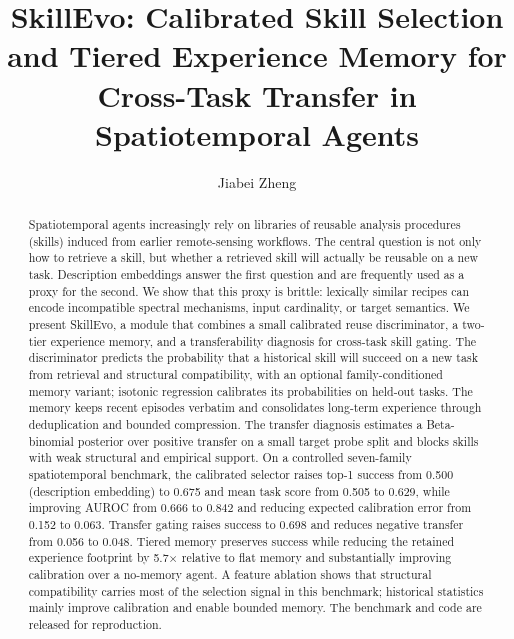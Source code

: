 \documentclass[journal]{IEEEtran}
\begin{document}
\title{SkillEvo: Calibrated Skill Selection and Tiered Experience Memory for Cross-Task Transfer in Spatiotemporal Agents}

\author{Jiabei Zheng}

\maketitle

\begin{abstract}
Spatiotemporal agents increasingly rely on libraries of reusable analysis procedures (skills) induced from earlier remote-sensing workflows. The central question is not only how to retrieve a skill, but whether a retrieved skill will actually be reusable on a new task. Description embeddings answer the first question and are frequently used as a proxy for the second. We show that this proxy is brittle: lexically similar recipes can encode incompatible spectral mechanisms, input cardinality, or target semantics. We present SkillEvo, a module that combines a small calibrated reuse discriminator, a two-tier experience memory, and a transferability diagnosis for cross-task skill gating. The discriminator predicts the probability that a historical skill will succeed on a new task from retrieval and structural compatibility, with an optional family-conditioned memory variant; isotonic regression calibrates its probabilities on held-out tasks. The memory keeps recent episodes verbatim and consolidates long-term experience through deduplication and bounded compression. The transfer diagnosis estimates a Beta-binomial posterior over positive transfer on a small target probe split and blocks skills with weak structural and empirical support. On a controlled seven-family spatiotemporal benchmark, the calibrated selector raises top-1 success from 0.500 (description embedding) to 0.675 and mean task score from 0.505 to 0.629, while improving AUROC from 0.666 to 0.842 and reducing expected calibration error from 0.152 to 0.063. Transfer gating raises success to 0.698 and reduces negative transfer from 0.056 to 0.048. Tiered memory preserves success while reducing the retained experience footprint by 5.7$\times$ relative to flat memory and substantially improving calibration over a no-memory agent. A feature ablation shows that structural compatibility carries most of the selection signal in this benchmark; historical statistics mainly improve calibration and enable bounded memory. The benchmark and code are released for reproduction.
\end{abstract}
\end{document}
